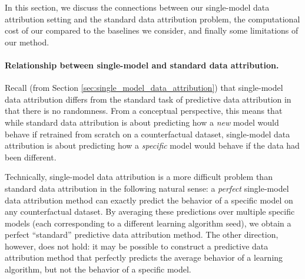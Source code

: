 In this section, we discuss the 
connections between our single-model data attribution setting and 
the standard data attribution problem, 
the computational cost of our \method{} compared to the baselines 
we consider, and finally some limitations of our method.

\paragraph{Relationship between single-model and standard data attribution.}
Recall (from Section \ref{sec:single_model_data_attribution}) that single-model data attribution 
differs from the standard task of predictive data
attribution in that there is no randomness. From a conceptual perspective, 
this means that while standard data attribution is about predicting how a 
{\em new} model would behave if retrained from scratch on a counterfactual
dataset, single-model data attribution is about predicting how a {\em specific}
model would behave if the data had been different.

Technically, single-model data attribution is a more difficult problem than
standard data attribution in the following natural sense: a {\em perfect}
single-model data attribution method can exactly predict the behavior 
of a specific model on any counterfactual dataset. 
By averaging these predictions over multiple specific models 
(each corresponding to a different learning algorithm seed),
we obtain a perfect ``standard'' predictive data attribution method.
The other direction, however, does not hold: it may be possible to construct
a predictive data attribution method that perfectly predicts the 
average behavior of a learning algorithm, but not the behavior
of a specific model.


